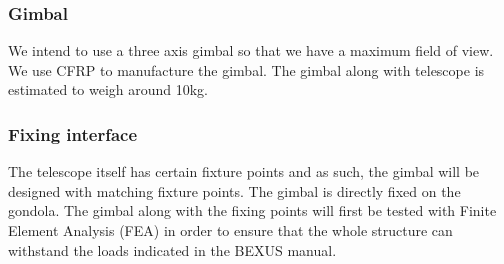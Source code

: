 \subsubsection{Gimbal}
\label {sec:4.4.3}
We intend to use a three axis gimbal so that we have a maximum field of view. We use CFRP to manufacture the gimbal. The gimbal along with telescope is estimated to weigh around 10kg.



\subsubsection{Fixing interface}
\label {sec:4.4.5}
The telescope itself has certain fixture points and as such, the gimbal will be designed with matching fixture points. The gimbal is directly fixed on the gondola. The gimbal along with the fixing points will first be tested with Finite Element Analysis (FEA) in order to ensure that the whole structure can withstand the loads indicated in the BEXUS manual. 
